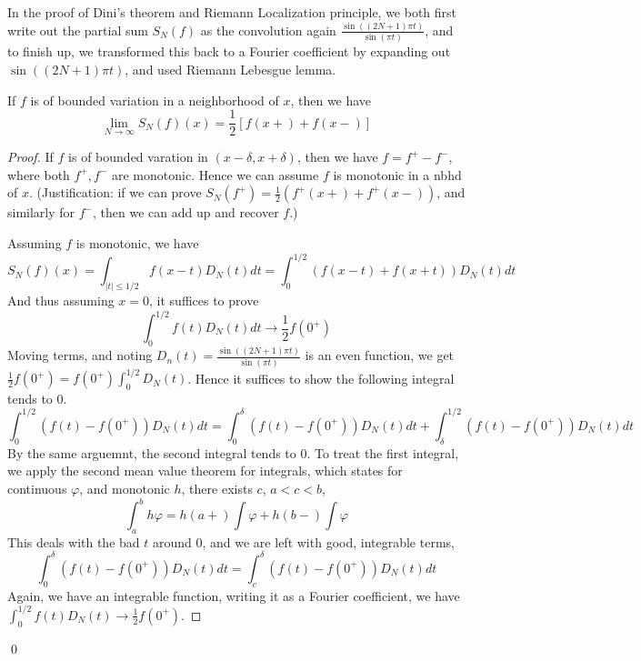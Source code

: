 \begin{remark}
    In the proof of Dini's theorem and Riemann Localization principle, we both first write out the partial sum $S_N(f)$ as the convolution again $\frac{\sin((2N+1)\pi t)}{\sin(\pi t)}$, and to finish up, we transformed this back to a Fourier coefficient by expanding out $\sin((2N+1)\pi t)$, and used Riemann Lebesgue lemma.
\end{remark}

\begin{theorem}
    If $f$ is of bounded variation in a neighborhood of $x$, then we have
    \begin{equation*}
        \lim_{N\to\infty}S_N(f)(x)=\frac{1}{2}[f(x+)+f(x-)]
    \end{equation*}
\end{theorem}
\begin{proof}
    If $f$ is of bounded varation in $(x-\delta, x+\delta)$, then we have $f=f^+-f^-$, where both $f^+, f^-$ are monotonic. Hence we can assume $f$ is monotonic in a nbhd of $x$. (Justification: if we can prove $S_N(f^+)=\frac{1}{2}(f^+(x+)+f^+(x-))$, and similarly for $f^-$, then we can add up and recover $f$.)

    Assuming $f$ is monotonic, we have
    \begin{equation*}
        S_N(f)(x)=\int_{|t|\leq1/2}f(x-t)D_N(t)dt=\int_0^{1/2}\left(f(x-t)+f(x+t) \right)D_N(t)dt
    \end{equation*}
    And thus assuming $x=0$, it suffices to prove
    \begin{equation*}
        \int_0^{1/2}f(t)D_N(t)dt\to\frac{1}{2}f(0^+)
    \end{equation*}
    Moving terms, and noting $D_n(t)=\frac{\sin((2N+1)\pi t)}{\sin(\pi t)}$ is an even function, we get $\frac{1}{2}f(0^+)=f(0^+)\int_0^{1/2}D_N(t)$. Hence it suffices to show the following integral tends to 0.
    \begin{equation*}
        \int_0^{1/2}(f(t)-f(0^+))D_N(t)dt=\int_0^\delta(f(t)-f(0^+))D_N(t)dt+\int_\delta^{1/2}(f(t)-f(0^+))D_N(t)dt
    \end{equation*}
    By the same arguemnt, the second integral tends to 0. To treat the first integral, we apply the second mean value theorem for integrals, which states for continuous $\varphi$, and monotonic $h$, there exists $c$, $a<c<b$, 
    \begin{equation*}
        \int_a^b h\varphi=h(a+)\int\varphi+h(b-)\int\varphi
    \end{equation*}
    This deals with the bad $t$ around 0, and we are left with good, integrable terms,
    \begin{equation*}
        \int_0^\delta(f(t)-f(0^+))D_N(t)dt=\int_c^\delta(f(t)-f(0^+))D_N(t)dt
    \end{equation*}
    Again, we have an integrable function, writing it as a Fourier coefficient, we have $\int_0^{1/2}f(t)D_N(t)\to\frac{1}{2}f(0^+)$.
\end{proof}
\qed

